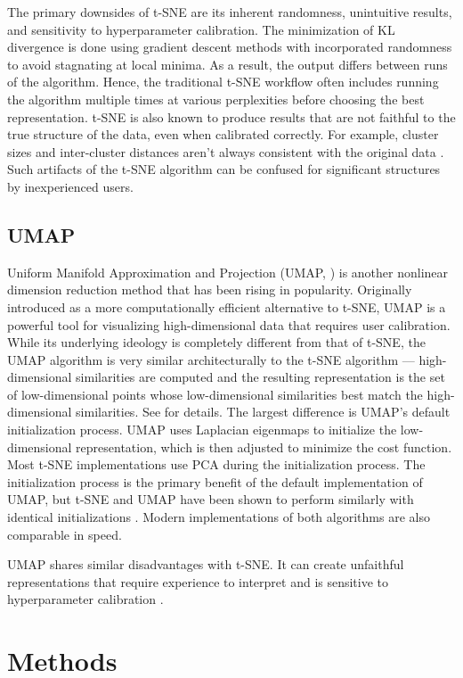 \documentclass{article}
\begin{document}
The primary downsides of t-SNE are its inherent randomness, unintuitive results, and sensitivity to hyperparameter calibration. The minimization of KL divergence is done using gradient descent methods with incorporated randomness to avoid stagnating at local minima. As a result, the output differs between runs of the algorithm. Hence, the traditional t-SNE workflow often includes running the algorithm multiple times at various perplexities before choosing the best representation. t-SNE is also known to produce results that are not faithful to the true structure of the data, even when calibrated correctly. For example, cluster sizes and inter-cluster distances aren't always consistent with the original data \cite{Distill}. Such artifacts of the t-SNE algorithm can be confused for significant structures by inexperienced users.

\subsection{UMAP}
Uniform Manifold Approximation and Projection (UMAP, \cite{umap}) is another nonlinear dimension reduction method that has been rising in popularity. Originally introduced as a more computationally efficient alternative to t-SNE, UMAP is a powerful tool for visualizing high-dimensional data that requires user calibration. While its underlying ideology is completely different from that of t-SNE, the UMAP algorithm is very similar architecturally to the t-SNE algorithm --- high-dimensional similarities are computed and the resulting representation is the set of low-dimensional points whose low-dimensional similarities best match the high-dimensional similarities. See \cite{umap} for details. The largest difference is UMAP's default initialization process. UMAP uses Laplacian eigenmaps to initialize the low-dimensional representation, which is then adjusted to minimize the cost function. Most t-SNE implementations use PCA during the initialization process. The initialization process is the primary benefit of the default implementation of UMAP, but t-SNE and UMAP have been shown to perform similarly with identical initializations \cite{t-SNE/UMAP example}. Modern implementations of both algorithms are also comparable in speed.

UMAP shares similar disadvantages with t-SNE. It can create unfaithful representations that require experience to interpret and is sensitive to hyperparameter calibration \cite{understanding UMAP}.

\section{Methods}
\end{document}
